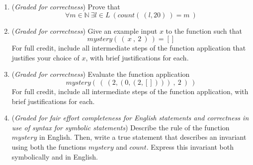 \documentclass[12pt, oneside]{article}
\begin{document}
\begin{enumerate}
   \begin{enumerate}
        \item ({\it Graded for correctness}) Prove that
            \[
                \forall m \in \mathbb{N}~ \exists l \in L ~\left( count(~(l,20)~) = m~ \right)
            \]

        \item ({\it Graded for correctness}) Give an example input $x$ to the function such that 
            \[
               mystery( ~(~ x ~,~ 2~) ~) = []
            \]
           For full credit, include all intermediate steps of the function application
           that justifies your choice of $x$, with brief justifications for each.

        \item ({\it Graded for correctness}) Evaluate the function application
            \[
                mystery( ~(~ (2, (0, (2, []) ) ) ~,~ 2~) ~)
            \]
         For full credit, include all intermediate steps of the function application,
         with brief justifications for each.
   
        \item ({\it Graded for fair effort completeness for English statements and correctness in use 
        of syntax for symbolic statements}) Describe the rule of the function 
        $mystery$ in English. Then, write a true statement that describes an invariant using
        both the functions $mystery$ and $count$. Express this invariant both symbolically 
        and in English.
    \end{enumerate}

\end{enumerate}
\end{document}
